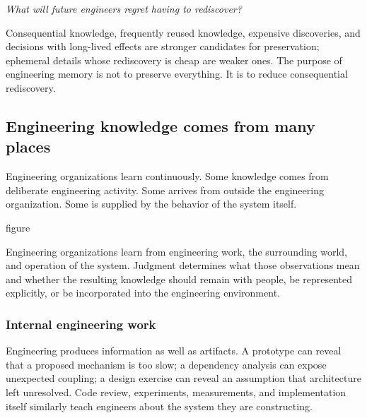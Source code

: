 \emph{What will future engineers regret having to rediscover?}

Consequential knowledge, frequently reused knowledge, expensive discoveries, and decisions with
long-lived effects are stronger candidates for preservation; ephemeral details whose rediscovery is
cheap are weaker ones. The purpose of engineering memory is not to preserve everything. It is to
reduce consequential rediscovery.

\subsection{Engineering knowledge comes from many places}\label{sec-knowledge-sources}

Engineering organizations learn continuously. Some knowledge comes from deliberate engineering
activity. Some arrives from outside the engineering organization. Some is supplied by the behavior
of the system itself.

\begin{bookbox}{figure}{} %
\pandocbounded{}

Engineering organizations learn from engineering work, the surrounding world, and operation of the
system. Judgment determines what those observations mean and whether the resulting knowledge should
remain with people, be represented explicitly, or be incorporated into the engineering environment.
\end{bookbox}

\subsubsection{Internal engineering work}\label{sec-internal-work}

Engineering produces information as well as artifacts. A prototype can reveal that a proposed
mechanism is too slow; a dependency analysis can expose unexpected coupling; a design exercise can
reveal an assumption that architecture left unresolved. Code review, experiments, measurements, and
implementation itself similarly teach engineers about the system they are constructing.

